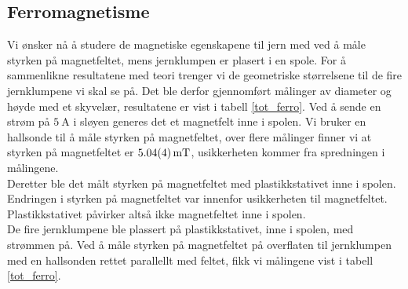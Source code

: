 \documentclass[%
 reprint,
 amsmath,amssymb,
 aps,
]{revtex4-1}
\begin{document}
\subsection{Ferromagnetisme}
Vi ønsker nå å studere de magnetiske egenskapene til jern med ved å måle styrken på magnetfeltet, mens jernklumpen er plasert i en spole. For å sammenlikne resultatene med teori trenger vi de geometriske størrelsene til de fire jernklumpene vi skal se på. Det ble derfor gjennomført målinger av diameter og høyde med et skyvelær, resultatene er vist  i tabell \vref{tot_ferro}.
Ved å sende en strøm på $\SI{5}{\ampere}$ i sløyen generes det et magnetfelt inne i spolen. Vi bruker en hallsonde til å måle styrken på magnetfeltet, over flere målinger finner vi at styrken på magnetfeltet er $\SI{5.04\pm0.04}{\milli\tesla}$, usikkerheten kommer fra spredningen i målingene. \\
Deretter ble det målt styrken på magnetfeltet med plastikkstativet inne i spolen. Endringen i styrken på magnetfeltet var innenfor usikkerheten til magnetfeltet. Plastikkstativet påvirker altså ikke magnetfeltet inne i spolen. \\
De fire jernklumpene ble plassert på plastikkstativet, inne i spolen, med strømmen på. Ved å måle styrken på magnetfeltet på overflaten til jernklumpen med en hallsonden rettet parallellt med feltet, fikk vi målingene vist i tabell \vref{tot_ferro}.\par
\end{document}
